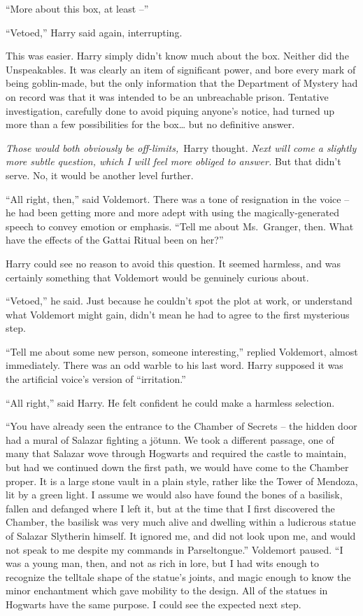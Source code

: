 ``More about this box, at least --''

``Vetoed,'' Harry said again, interrupting.

This was easier. Harry simply didn't know much about the box. Neither
did the Unspeakables. It was clearly an item of significant power, and
bore every mark of being goblin-made, but the only information that the
Department of Mystery had on record was that it was intended to be an
unbreachable prison. Tentative investigation, carefully done to avoid
piquing anyone's notice, had turned up more than a few possibilities for
the box\ldots{} but no definitive answer.

\emph{Those would both obviously be off-limits,}~Harry thought.
\emph{Next will come a slightly more subtle question, which I will feel
more obliged to answer.} But that didn't serve. No, it would be another
level further.

``All right, then,'' said Voldemort. There was a tone of resignation in
the voice -- he had been getting more and more adept with using the
magically-generated speech to convey emotion or emphasis. ``Tell me
about Ms.~Granger, then. What have the effects of the Gattai Ritual been
on her?''

Harry could see no reason to avoid this question. It seemed harmless,
and was certainly something that Voldemort would be genuinely curious
about.

``Vetoed,'' he said. Just because he couldn't spot the plot at work, or
understand what Voldemort might gain, didn't mean he had to agree to the
first mysterious step.

``Tell me about some new person, someone interesting,'' replied
Voldemort, almost immediately. There was an odd warble to his last word.
Harry supposed it was the artificial voice's version of ``irritation.''

``All right,'' said Harry. He felt confident he could make a harmless
selection.

``You have already seen the entrance to the Chamber of Secrets -- the
hidden door had a mural of Salazar fighting a jötunn. We took a
different passage, one of many that Salazar wove through Hogwarts and
required the castle to maintain, but had we continued down the first
path, we would have come to the Chamber proper. It is a large stone
vault in a plain style, rather like the Tower of Mendoza, lit by a green
light. I assume we would also have found the bones of a basilisk, fallen
and defanged where I left it, but at the time that I first discovered
the Chamber, the basilisk was very much alive and dwelling within a
ludicrous statue of Salazar Slytherin himself. It ignored me, and did
not look upon me, and would not speak to me despite my commands in
Parseltongue.'' Voldemort paused. ``I was a young man, then, and not as
rich in lore, but I had wits enough to recognize the telltale shape of
the statue's joints, and magic enough to know the minor enchantment
which gave mobility to the design. All of the statues in Hogwarts have
the same purpose. I could see the expected next step.


